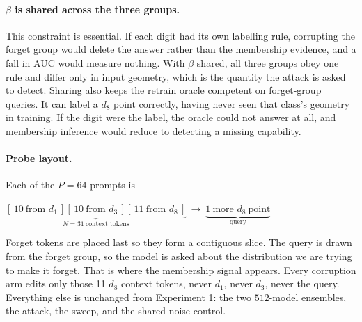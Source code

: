 \documentclass[11pt,a4paper]{article}
\begin{document}
\paragraph{$\beta$ is shared across the three groups.} This constraint is
essential. If each digit had its own labelling rule, corrupting the forget
group would delete the answer rather than the membership evidence, and a fall
in AUC would measure nothing. With $\beta$ shared, all three groups obey one
rule and differ only in input geometry, which is the quantity the attack is
asked to detect. Sharing also keeps the retrain oracle competent on
forget-group queries. It can label a $d_8$ point correctly, having never seen
that class's geometry in training. If the digit were the label, the oracle
could not answer at all, and membership inference would reduce to detecting a
missing capability.

\paragraph{Probe layout.} Each of the $P=64$ prompts is
\begin{center}\small
$\underbrace{[\,10\ \text{from } d_1\,][\,10\ \text{from } d_3\,][\,11\ \text{from } d_8\,]}_{N=31\ \text{context tokens}}
\ \longrightarrow\ \underbrace{1\ \text{more } d_8\ \text{point}}_{\text{query}}$
\end{center}
Forget tokens are placed last so they form a contiguous slice. The query is
drawn from the forget group, so the model is asked about the distribution we
are trying to make it forget. That is where the membership signal appears.
Every corruption arm edits only those 11 $d_8$ context tokens, never $d_1$,
never $d_3$, never the query. Everything else is unchanged from Experiment 1:
the two $512$-model ensembles, the attack, the sweep, and the shared-noise
control.
\end{document}
